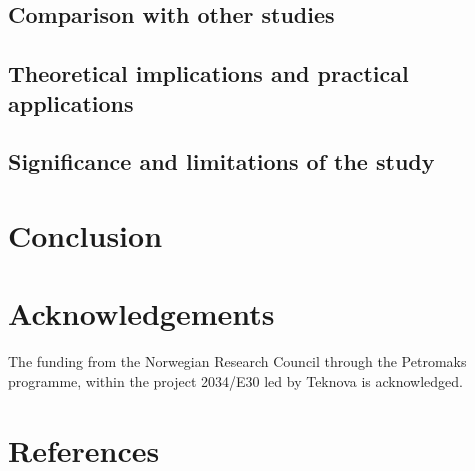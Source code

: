 \documentclass[final,times,3p]{elsarticle}
\begin{document}
	\subsection{Comparison with other studies}

	\subsection{Theoretical implications and practical applications}


	
	\subsection{Significance and limitations of the study}


\section{Conclusion}
\label{sec:conclusion}
			

\section*{Acknowledgements}
The funding from the Norwegian Research Council through the Petromaks programme, within the project 2034/E30 led by Teknova is acknowledged. 


\appendix



\section*{References}
\label{References}



			
\end{document}
